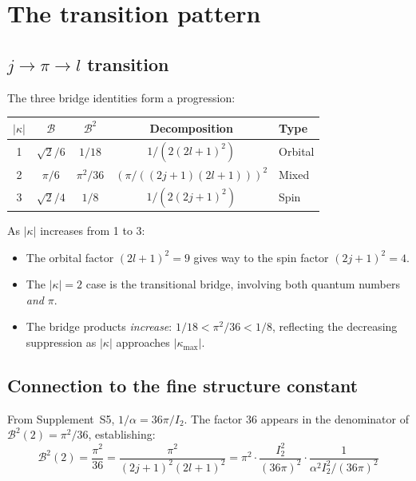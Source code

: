 \documentclass[11pt,letterpaper]{article}
\numberwithin{equation}{section}
\begin{document}
\section{The transition pattern}
\label{sec:transition}

\subsection{$j \to \pi \to l$ transition}

The three bridge identities form a progression:

\begin{center}
\begin{tabular}{ccccl}
\toprule
$|\kappa|$ & $\mathcal{B}$ & $\mathcal{B}^2$ & Decomposition & Type \\
\midrule
1 & $\sqrt{2}/6$ & $1/18$ & $1/(2(2l+1)^2)$ & Orbital \\
2 & $\pi/6$ & $\pi^2/36$ & $(\pi/((2j+1)(2l+1)))^2$ & Mixed \\
3 & $\sqrt{2}/4$ & $1/8$ & $1/(2(2j+1)^2)$ & Spin \\
\bottomrule
\end{tabular}
\end{center}

As $|\kappa|$ increases from 1 to 3:
\begin{itemize}
  \item The orbital factor $(2l+1)^2 = 9$ gives way to the spin factor
    $(2j+1)^2 = 4$.
  \item The $|\kappa| = 2$ case is the transitional bridge, involving both
    quantum numbers \emph{and} $\pi$.
  \item The bridge products \emph{increase}: $1/18 < \pi^2/36 < 1/8$,
    reflecting the decreasing suppression as $|\kappa|$ approaches
    $|\kappa_\mathrm{max}|$.
\end{itemize}

\subsection{Connection to the fine structure constant}

From Supplement~S5, $1/\alpha = 36\pi/I_2$. The factor 36 appears in the
denominator of $\mathcal{B}^2(2) = \pi^2/36$, establishing:
\begin{equation}
  \mathcal{B}^2(2) = \frac{\pi^2}{36} = \frac{\pi^2}{(2j+1)^2(2l+1)^2}
  = \pi^2 \cdot \frac{I_2^2}{(36\pi)^2} \cdot \frac{1}{\alpha^2 I_2^2/(36\pi)^2}
\end{equation}
\end{document}
